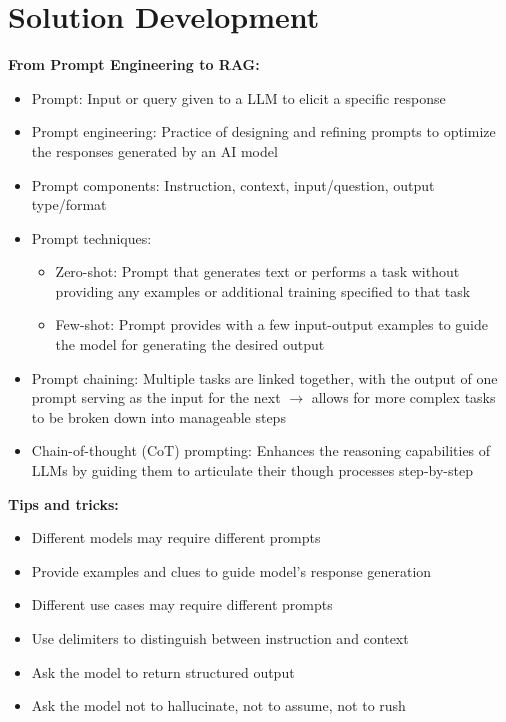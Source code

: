 \documentclass[11pt]{scrartcl}
\begin{document}
\newpage
\section{Solution Development}
\textbf{From Prompt Engineering to RAG:}
\begin{itemize}
	\item Prompt: Input or query given to a LLM to elicit a specific response
	\item Prompt engineering: Practice of designing and refining prompts to optimize the responses generated by an AI model
	\item Prompt components: Instruction, context, input/question, output type/format
	\item Prompt techniques:
	\begin{itemize}
		\item Zero-shot: Prompt that generates text or performs a task without providing any examples or additional training specified to that task
		\item Few-shot: Prompt provides with a few input-output examples to guide the model for generating the desired output
	\end{itemize}
	\item Prompt chaining: Multiple tasks are linked together, with the output of one prompt serving as the input for the next $\to$ allows for more complex tasks to be broken down into manageable steps
	\item Chain-of-thought (CoT) prompting: Enhances the reasoning capabilities of LLMs by guiding them to articulate their though processes step-by-step
\end{itemize}

\textbf{Tips and tricks:}
\begin{itemize}
	\item Different models may require different prompts
	\item Provide examples and clues to guide model's response generation
	\item Different use cases may require different prompts
	\item Use delimiters to distinguish between instruction and context
	\item Ask the model to return structured output
	\item Ask the model not to hallucinate, not to assume, not to rush
\end{itemize}
\end{document}

